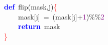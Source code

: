 \noindent
\mbox{}\textbf{\textcolor{Blue}{def}}\ flip\textcolor{BrickRed}{(}mask\textcolor{BrickRed}{,}j\textcolor{BrickRed}{)}\textcolor{Red}{\{} \\
\mbox{}\ \ \ \ mask\textcolor{BrickRed}{[}j\textcolor{BrickRed}{]}\ \textcolor{BrickRed}{=}\ \textcolor{BrickRed}{(}mask\textcolor{BrickRed}{[}j\textcolor{BrickRed}{]+}\textcolor{Purple}{1}\textcolor{BrickRed}{)\%\%}\textcolor{Purple}{2} \\
\mbox{}\ \ \ \ \textbf{\textcolor{Blue}{return}}\ mask \\
\mbox{}\textcolor{Red}{\}} \\
\mbox{}

